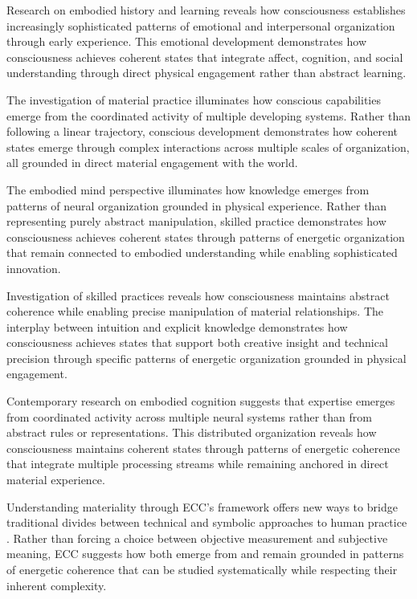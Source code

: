 \begin{refsection}
Research on embodied history and learning \cite{toren1999mind} reveals how consciousness establishes increasingly sophisticated patterns of emotional and interpersonal organization through early experience. This emotional development demonstrates how consciousness achieves coherent states that integrate affect, cognition, and social understanding through direct physical engagement rather than abstract learning.

The investigation of material practice \cite{warnier2001praxeological} illuminates how conscious capabilities emerge from the coordinated activity of multiple developing systems. Rather than following a linear trajectory, conscious development demonstrates how coherent states emerge through complex interactions across multiple scales of organization, all grounded in direct material engagement with the world.

The embodied mind perspective \cite{csordas1990embodiment} illuminates how knowledge emerges from patterns of neural organization grounded in physical experience. Rather than representing purely abstract manipulation, skilled practice demonstrates how consciousness achieves coherent states through patterns of energetic organization that remain connected to embodied understanding while enabling sophisticated innovation.

Investigation of skilled practices \cite{marchand2010making} reveals how consciousness maintains abstract coherence while enabling precise manipulation of material relationships. The interplay between intuition and explicit knowledge demonstrates how consciousness achieves states that support both creative insight and technical precision through specific patterns of energetic organization grounded in physical engagement.

Contemporary research on embodied cognition \cite{jackson1989knowledge} suggests that expertise emerges from coordinated activity across multiple neural systems rather than from abstract rules or representations. This distributed organization reveals how consciousness maintains coherent states through patterns of energetic coherence that integrate multiple processing streams while remaining anchored in direct material experience.

Understanding materiality through ECC's framework offers new ways to bridge traditional divides between technical and symbolic approaches to human practice \cite{ingold2013making}. Rather than forcing a choice between objective measurement and subjective meaning, ECC suggests how both emerge from and remain grounded in patterns of energetic coherence that can be studied systematically while respecting their inherent complexity.


\end{refsection}
